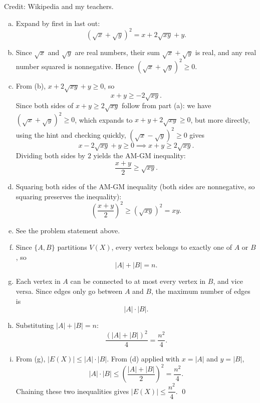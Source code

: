 \documentclass[12pt]{article}
\begin{document}
Credit: Wikipedia and my teachers.

\begin{enumerate}[(a)]

  \item Expand by first in last out:
  \[
    (\sqrt{x}+\sqrt{y})^2 = x + 2\sqrt{xy} + y.
  \]

  \item Since $\sqrt{x}$ and $\sqrt{y}$ are real numbers, their sum $\sqrt{x}+\sqrt{y}$ is real,
  and any real number squared is nonnegative. Hence $(\sqrt{x}+\sqrt{y})^2 \geq 0$.

  \item From (b), $x + 2\sqrt{xy} + y \geq 0$, so
  \[
    x + y \geq -2\sqrt{xy}.
  \]
  Since both sides of $x+y \geq 2\sqrt{xy}$ follow from part (a):
  we have $(\sqrt{x}+\sqrt{y})^2 \geq 0$, which expands to $x+y+2\sqrt{xy}\geq 0$,
  but more directly, using the hint and checking quickly, $(\sqrt{x}-\sqrt{y})^2 \geq 0$ gives
  \[
    x - 2\sqrt{xy} + y \geq 0 \implies x+y \geq 2\sqrt{xy}.
  \]
  Dividing both sides by $2$ yields the AM-GM inequality:
  \[
    \frac{x+y}{2} \geq \sqrt{xy}.
  \]

  \item Squaring both sides of the AM-GM inequality (both sides are nonneg\-ative, so
  squaring preserves the inequality):
  \[
    \left(\frac{x+y}{2}\right)^2 \geq \left(\sqrt{xy}\right)^2 = xy.
  \]

  \item See the problem statement above.

  \item Since $\{A,B\}$ partitions $V(X)$, every vertex belongs to exactly one of $A$ or $B$, so
  \[
    |A| + |B| = n.
  \]

  \item Each vertex in $A$ can be connected to at most every vertex in $B$, and vice versa.
  Since edges only go between $A$ and $B$, the maximum number of edges is
  \[
    |A| \cdot |B|.
  \]

  \item Substituting $|A|+|B|=n$:
  \[
    \frac{(|A|+|B|)^2}{4} = \frac{n^2}{4}.
  \]

  \item From (g), $|E(X)| \leq |A|\cdot|B|$. From (d) applied with $x = |A|$ and $y = |B|$,
  \[
    |A|\cdot|B| \leq \left(\frac{|A|+|B|}{2}\right)^2 = \frac{n^2}{4}.
  \]
  Chaining these two inequalities gives $|E(X)| \leq \dfrac{n^2}{4}$. \qed

\end{enumerate}
\end{document}
